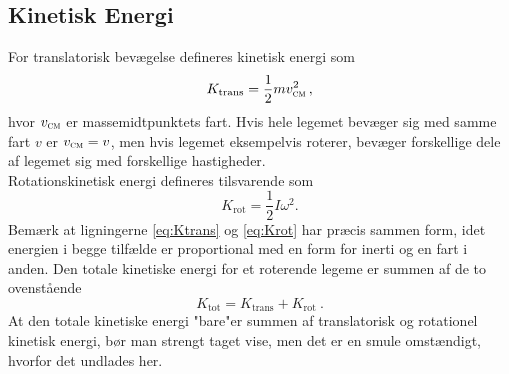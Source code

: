 \subsection{Kinetisk Energi}
For translatorisk bevægelse defineres kinetisk energi som
%
\begin{equation} \label{eq:Ktrans}
    K_{\text{trans}}=\frac{1}{2}mv_\textsc{cm}^2 \,,
\end{equation}
%
hvor $v_\textsc{cm}$ er massemidtpunktets fart. Hvis hele legemet bevæger sig med samme fart $v$ er $v_\textsc{cm} = v$, men hvis legemet eksempelvis roterer, bevæger forskellige dele af legemet sig med forskellige hastigheder. \\
Rotationskinetisk energi defineres tilsvarende som
%
\begin{equation} \label{eq:Krot}
    K_{\text{rot}}=\frac{1}{2}I\omega^2 .
\end{equation}
%
Bemærk at ligningerne \eqref{eq:Ktrans} og \eqref{eq:Krot} har præcis sammen form, idet energien i begge tilfælde er proportional med en form for inerti og en fart i anden. Den totale kinetiske energi for et roterende legeme er summen af de to ovenstående
%
\begin{equation} \label{eq:K}
    K_{\text{tot}}=K_{\text{trans}}+K_{\text{rot}} \: .
\end{equation}
%
At den totale kinetiske energi "bare"\;er summen af translatorisk og rotationel kinetisk energi, bør man strengt taget vise, men det er en smule omstændigt, hvorfor det undlades her.


